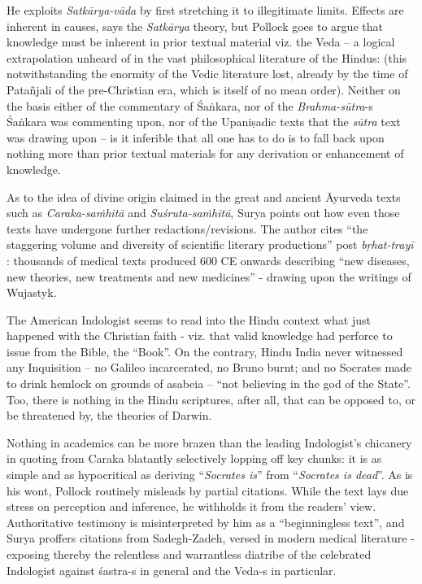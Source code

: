 He exploits {\sl Satkārya-vāda} by first stretching it to illegitimate limits. Effects are inherent in causes, says the {\sl Satkārya} theory, but Pollock goes to argue that knowledge must be inherent in prior textual material viz. the Veda -- a logical extrapolation unheard of in the vast philosophical literature of the Hindus: (this notwithstanding the enormity of the Vedic literature lost, already by the time of Patañjali of the pre-Christian era, which is itself of no mean order). Neither on the basis either of the commentary of Śaṅkara, nor of the {\sl Brahma-sūtra}-s Śaṅkara was commenting upon, nor of the Upaniṣadic texts that the {\sl sūtra} text was drawing upon -- is it inferible that all one has to do is to fall back upon nothing more than prior textual materials for any derivation or enhancement of knowledge.

As to the idea of divine origin claimed in the great and ancient Āyurveda texts such as {\sl Caraka-saṁhitā} and {\sl Suśruta-saṁhitā}, Surya points out how even those texts have undergone further redactions/revisions. The author cites “the staggering volume and diversity of scientific literary productions” post {\sl bṛhat-trayī} : thousands of medical texts produced 600 CE onwards describing “new diseases, new theories, new treatments and new medicines” - drawing upon the writings of Wujastyk.

The American Indologist seems to read into the Hindu context what just happened with the Christian faith - viz. that valid knowledge had perforce to issue from the Bible, the “Book”. On the contrary, Hindu India never witnessed any Inquisition -- no Galileo incarcerated, no Bruno burnt; and no Socrates made to drink hemlock on grounds of asabeia -- “not believing in the god of the State”. Too, there is nothing in the Hindu scriptures, after all, that can be opposed to, or be threatened by, the theories of Darwin.

\newpage

Nothing in academics can be more brazen than the leading Indologist’s chicanery in quoting from Caraka blatantly selectively lopping off key chunks: it is as simple and as hypocritical as deriving “{\sl Socrates is}” from “{\sl Socrates is dead}”. As is his wont, Pollock routinely misleads by partial citations. While the text lays due stress on perception and inference, he withholds it from the readers’ view. Authoritative testimony is misinterpreted by him as a “beginningless text”, and Surya proffers citations from Sadegh-Zadeh, versed in modern medical literature - exposing thereby the relentless and warrantless diatribe of the celebrated Indologist against śastra-s in general and the Veda-s in particular.

